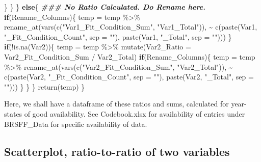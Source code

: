 \documentclass[
]{article}
\newenvironment{Shaded}{\begin{snugshade}}{\end{snugshade}}
\newcommand{\AttributeTok}[1]{\textcolor[rgb]{0.77,0.63,0.00}{#1}}
\newcommand{\ControlFlowTok}[1]{\textcolor[rgb]{0.13,0.29,0.53}{\textbf{#1}}}
\newcommand{\DocumentationTok}[1]{\textcolor[rgb]{0.56,0.35,0.01}{\textbf{\textit{#1}}}}
\newcommand{\FunctionTok}[1]{\textcolor[rgb]{0.00,0.00,0.00}{#1}}
\newcommand{\NormalTok}[1]{#1}
\newcommand{\OtherTok}[1]{\textcolor[rgb]{0.56,0.35,0.01}{#1}}
\newcommand{\SpecialCharTok}[1]{\textcolor[rgb]{0.00,0.00,0.00}{#1}}
\newcommand{\StringTok}[1]{\textcolor[rgb]{0.31,0.60,0.02}{#1}}
\begin{document}
\begin{Shaded}
\begin{Highlighting}[]
\NormalTok{      \}}
\NormalTok{    \}}
\NormalTok{  \}}
  \ControlFlowTok{else}\NormalTok{\{}
    \DocumentationTok{\#\#\# No Ratio Calculated. Do Rename here.}
    \ControlFlowTok{if}\NormalTok{(Rename\_Columns)\{}
\NormalTok{      temp }\OtherTok{=}\NormalTok{ temp }\SpecialCharTok{\%\textgreater{}\%} 
        \FunctionTok{rename\_at}\NormalTok{(}\FunctionTok{vars}\NormalTok{(}\FunctionTok{c}\NormalTok{(}\StringTok{"Var1\_Fit\_Condition\_Sum"}\NormalTok{, }\StringTok{"Var1\_Total"}\NormalTok{)), }
                  \SpecialCharTok{\textasciitilde{}} \FunctionTok{c}\NormalTok{(}\FunctionTok{paste}\NormalTok{(Var1, }\StringTok{"\_Fit\_Condition\_Count"}\NormalTok{, }\AttributeTok{sep =} \StringTok{""}\NormalTok{),}
                      \FunctionTok{paste}\NormalTok{(Var1, }\StringTok{"\_Total"}\NormalTok{, }\AttributeTok{sep =} \StringTok{""}\NormalTok{)))}
\NormalTok{    \}}
    \ControlFlowTok{if}\NormalTok{(}\SpecialCharTok{!}\FunctionTok{is.na}\NormalTok{(Var2))\{}
\NormalTok{      temp }\OtherTok{=}\NormalTok{ temp }\SpecialCharTok{\%\textgreater{}\%} \FunctionTok{mutate}\NormalTok{(}\AttributeTok{Var2\_Ratio =}\NormalTok{ Var2\_Fit\_Condition\_Sum }\SpecialCharTok{/}\NormalTok{ Var2\_Total)}
      \ControlFlowTok{if}\NormalTok{(Rename\_Columns)\{}
\NormalTok{        temp }\OtherTok{=}\NormalTok{ temp }\SpecialCharTok{\%\textgreater{}\%} 
          \FunctionTok{rename\_at}\NormalTok{(}\FunctionTok{vars}\NormalTok{(}\FunctionTok{c}\NormalTok{(}\StringTok{"Var2\_Fit\_Condition\_Sum"}\NormalTok{, }\StringTok{"Var2\_Total"}\NormalTok{)), }
                    \SpecialCharTok{\textasciitilde{}} \FunctionTok{c}\NormalTok{(}\FunctionTok{paste}\NormalTok{(Var2, }\StringTok{"\_Fit\_Condition\_Count"}\NormalTok{, }\AttributeTok{sep =} \StringTok{""}\NormalTok{),}
                        \FunctionTok{paste}\NormalTok{(Var2, }\StringTok{"\_Total"}\NormalTok{, }\AttributeTok{sep =} \StringTok{""}\NormalTok{)))}
\NormalTok{      \}}
\NormalTok{    \}}
\NormalTok{  \}}
  \FunctionTok{return}\NormalTok{(temp)}
\NormalTok{\}}
\end{Highlighting}
\end{Shaded}

Here, we shall have a dataframe of these ratios and sums, calculated for
year-states of good availability. See Codebook.xlsx for availability of
entries under BRSFF\_Data for specific availability of data.

\hypertarget{scatterplot-ratio-to-ratio-of-two-variables}{%
\subsection{Scatterplot, ratio-to-ratio of two
variables}\label{scatterplot-ratio-to-ratio-of-two-variables}}
\end{document}
